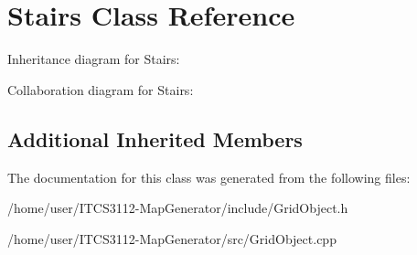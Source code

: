 \hypertarget{classStairs}{}\section{Stairs Class Reference}
\label{classStairs}


Inheritance diagram for Stairs\+:


Collaboration diagram for Stairs\+:
\subsection*{Additional Inherited Members}


The documentation for this class was generated from the following files\+:\begin{DoxyCompactItemize}
\item 
/home/user/\+I\+T\+C\+S3112-\/\+Map\+Generator/include/Grid\+Object.\+h\item 
/home/user/\+I\+T\+C\+S3112-\/\+Map\+Generator/src/Grid\+Object.\+cpp\end{DoxyCompactItemize}
